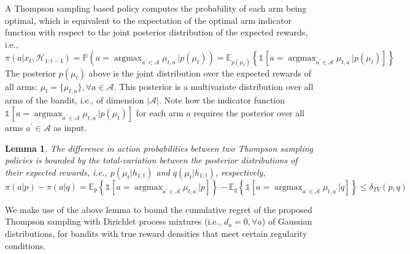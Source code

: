 \documentclass{article}
\newtheorem{lemma}{Lemma}
\newcommand{\eValue}[2]{\mathbb{E}_{#1}\left\{ #2 \right\}}
\newcommand{\Prob}[1]{\mathbb{P}\left( #1 \right)}
\newcommand{\myind}[1]{\ind{}\left[#1\right]}
\newcommand{\A}{\mathcal{A}}
\newcommand{\HH}{\mathcal{H}}
\newcommand{\ie}{i.e., }
\newcommand{\argmax}{\mathop{\mathrm{argmax}}}
\newcommand{\ind}[1]{\mathds{1}_{#1}} %
\begin{document}
A Thompson sampling based policy computes the probability of each arm being optimal, which is equivalent to the expectation of the optimal arm indicator function with respect to the joint posterior distribution of the expected rewards, \ie
\begin{equation}
\pi(a|x_{t},\HH_{1:t-1})=\Prob{a=\argmax_{a^\prime \in \A} \mu_{t,a^\prime}|p(\mu_t)} = \eValue{p(\mu_t)}{\myind{a=\argmax_{a^\prime \in \A}\mu_{t,a^\prime}|p(\mu_t)}} 
\end{equation}
The posterior $p(\mu_t)$ above is the joint distribution over the expected rewards of all arms: $\mu_{t}=\{\mu_{t,a}\}, \forall a\in \A$. This posterior is a multivariate distribution over all arms of the bandit, \ie of dimension $|\A|$. Note how the indicator function $\myind{a=\argmax_{a^\prime \in \A}\mu_{t,a^\prime}|p(\mu_t)}$ for each arm $a$ requires the posterior over all arms $a^\prime \in \A$ as input.

\begin{lemma}
	The difference in action probabilities between two Thompson sampling policies is bounded by the total-variation between the posterior distributions of their expected rewards, \ie $p(\mu_{t}|h_{1:t})$ and $q(\mu_{t}|h_{1:t})$, respectively,
	\begin{equation}
	\pi(a|p) - \pi(a|q) = \eValue{p}{\myind{a=\argmax_{a^\prime \in \A} \mu_{t,a^\prime}|p}} - \eValue{q}{\myind{a=\argmax_{a^\prime \in \A} \mu_{t,a^\prime}|q}} \leq \delta_{TV}(p,q)
	\nonumber
	\end{equation}
	\label{lemma:total_variation_bounds_diff_policies}
\end{lemma}

We make use of the above lemma to bound the cumulative regret of the proposed Thompson sampling with Dirichlet process mixtures (\ie $d_a=0, \forall a$) of Gaussian distributions, for bandits with true reward densities that meet certain regularity conditions.
\end{document}
